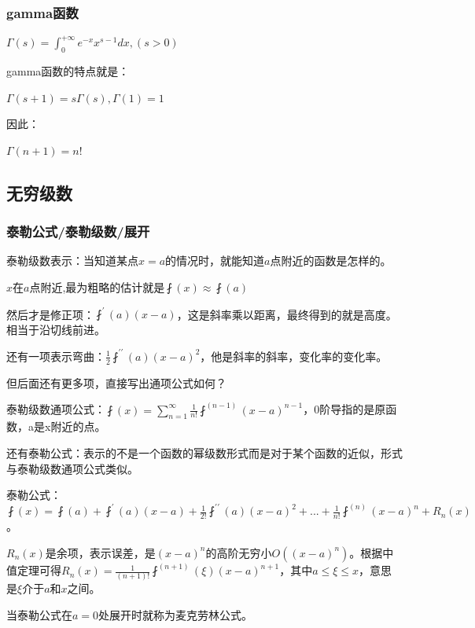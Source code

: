 \documentclass[UTF8]{ctexbook}
\newcommand{\derivative}{^\prime}
\newcommand{\doubleDerivative}{^{\prime\prime}}
\newcommand{\aLotDerivative}[1]{^{(#1)}}
\newcommand{\UpDownSum}[2]{\sum\limits_{#1}^{#2}}
\newcommand{\fDerivative}[1]{\fint\derivative(#1)}
\newcommand{\defFunction}[1]{\fint(#1)}
\newcommand{\definiteIntegral}[2]{\int^{#1}_{#2}}
\begin{document}
{{{\subsubsection{gamma函数}{
$\varGamma(s) = \definiteIntegral{+\infty}{0}e^{-x}x^{s-1}dx, (s > 0)$

gamma函数的特点就是：

$\varGamma(s + 1) = s\varGamma(s), \varGamma(1) = 1$

因此：

$\varGamma(n+1) = n!$

}%

}%

\subsection{无穷级数}{

\subsubsection{泰勒公式/泰勒级数/展开}{
泰勒级数表示：当知道某点$x = a$的情况时，就能知道$a$点附近的函数是怎样的。

$x$在$a$点附近,最为粗略的估计就是$\defFunction{x} \approx \defFunction{a}$

然后才是修正项：$\fDerivative{a}(x - a)$，这是斜率乘以距离，最终得到的就是高度。相当于沿切线前进。

还有一项表示弯曲：$\frac{1}{2}\fint\doubleDerivative(a)(x - a)^2$，他是斜率的斜率，变化率的变化率。

但后面还有更多项，直接写出通项公式如何？

泰勒级数通项公式：$\defFunction{x} = \UpDownSum{n = 1}{\infty}\frac{1}{n!}\fint\aLotDerivative{n - 1}(x - a)^{n - 1}$，0阶导指的是原函数，a是x附近的点。

还有泰勒公式：表示的不是一个函数的幂级数形式而是对于某个函数的近似，形式与泰勒级数通项公式类似。

泰勒公式：$\defFunction{x} = \defFunction{a} + \fDerivative{a}(x - a) + \frac{1}{2!}\fint\doubleDerivative(a)(x - a)^2 + ... + \frac{1}{n!}\fint\aLotDerivative{n}(x - a)^n + R_n(x)$。

$R_n(x)$是余项，表示误差，是$(x - a)^n$的高阶无穷小$O((x - a)^n)$。根据中值定理可得$R_n(x) = \frac{1}{(n + 1)!}\fint\aLotDerivative{n + 1}(\xi)(x - a)^{n+1}$，其中$a \leq \xi \leq x$，意思是$\xi$介于$a$和$x$之间。

当泰勒公式在$a = 0$处展开时就称为麦克劳林公式。

}}}}
\end{document}
